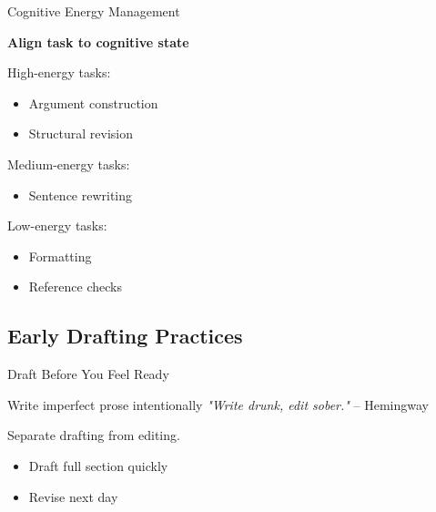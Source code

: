 \documentclass{beamer}
\begin{document}



\begin{frame}{Cognitive Energy Management}


\textbf{Align task to cognitive state}

\vspace{0.5em}


High-energy tasks:
\begin{itemize}
    \item Argument construction
    \item Structural revision
\end{itemize}

Medium-energy tasks:
\begin{itemize}
    \item Sentence rewriting
\end{itemize}

Low-energy tasks:
\begin{itemize}
    \item Formatting
    \item Reference checks
\end{itemize}


\end{frame}

\subsection{Early Drafting Practices}

\begin{frame}{Draft Before You Feel Ready}

\begin{block}{Write imperfect prose intentionally}
    \textit{"Write drunk, edit sober."} -- Hemingway
\end{block}

Separate drafting from editing.

\begin{itemize}
    \item Draft full section quickly
    \item Revise next day
\end{itemize}

\end{frame}
\end{document}
